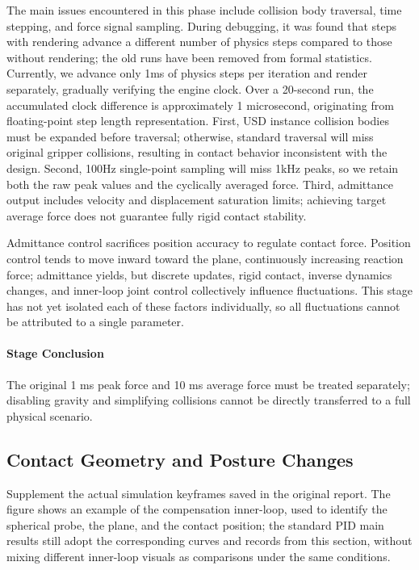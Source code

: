 The main issues encountered in this phase include collision body traversal, time stepping, and force signal sampling. During debugging, it was found that steps with rendering advance a different number of physics steps compared to those without rendering; the old runs have been removed from formal statistics. Currently, we advance only 1ms of physics steps per iteration and render separately, gradually verifying the engine clock. Over a 20-second run, the accumulated clock difference is approximately 1 microsecond, originating from floating-point step length representation. First, USD instance collision bodies must be expanded before traversal; otherwise, standard traversal will miss original gripper collisions, resulting in contact behavior inconsistent with the design. Second, 100Hz single-point sampling will miss 1kHz peaks, so we retain both the raw peak values and the cyclically averaged force. Third, admittance output includes velocity and displacement saturation limits; achieving target average force does not guarantee fully rigid contact stability.

Admittance control sacrifices position accuracy to regulate contact force. Position control tends to move inward toward the plane, continuously increasing reaction force; admittance yields, but discrete updates, rigid contact, inverse dynamics changes, and inner-loop joint control collectively influence fluctuations. This stage has not yet isolated each of these factors individually, so all fluctuations cannot be attributed to a single parameter.


\paragraph{Stage Conclusion} The original 1 ms peak force and 10 ms average force must be treated separately; disabling gravity and simplifying collisions cannot be directly transferred to a full physical scenario.



\subsection{Contact Geometry and Posture Changes}
Supplement the actual simulation keyframes saved in the original report. The figure shows an example of the compensation inner-loop, used to identify the spherical probe, the plane, and the contact position; the standard PID main results still adopt the corresponding curves and records from this section, without mixing different inner-loop visuals as comparisons under the same conditions.

